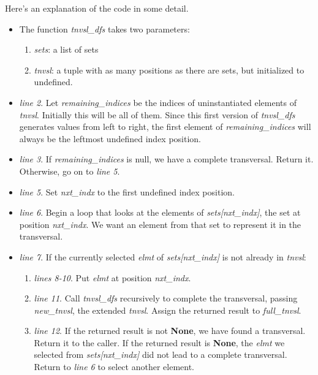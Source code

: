Here's an explanation of the code in some detail.
\begin{itemize}
    \item The function \textit{tnvsl\_dfs} takes two parameters: 
        \begin{enumerate}
            \item \textit{sets}: a list of sets
            \item \textit{tnvsl}: a tuple with as many positions as there are sets, but initialized to undefined.
        \end{enumerate}
    \item \textit{line 2}. Let \textit{remaining\_indices} be the indices of uninstantiated elements of \textit{tnvsl}. Initially this will be all of them. Since this first version of \textit{tnvsl\_dfs} generates values from left to right, the first element of \textit{remaining\_indices} will always be the leftmost undefined index position.
    \item \textit{line 3}. If \textit{remaining\_indices} is null, we have a complete transversal. Return it. Otherwise, go on to \textit{line 5}.
    \item \textit{line 5}. Set \textit{nxt\_indx} to the first undefined index position.
    \item \textit{line 6}. Begin a loop that looks at the elements of \textit{sets[nxt\_indx]}, the set at position  \textit{nxt\_indx}. We want an element from that set to represent it in the transversal.
    \item \textit{line 7}. If the currently selected \textit{elmt} of \textit{sets[nxt\_indx]} is not already in \textit{tnvsl}:
    \begin{enumerate}
        \item \textit{lines 8-10}. Put \textit{elmt} at position \textit{nxt\_indx}.
        \item \textit{line 11}. Call \textit{tnvsl\_dfs} recursively to complete the transversal, passing \textit{new\_tnvsl}, the extended \textit{tnvsl}. Assign the returned result to \textit{full\_tnvsl}.
        \item \textit{line 12}. If the returned result is not \textbf{None}, we have found a transversal. Return it to the caller. If the  returned result is \textbf{None}, the \textit{elmt} we selected from \textit{sets[nxt\_indx]} did not lead to a complete transversal. Return to \textit{line 6} to select another element.
    \end{enumerate}
\end{itemize}

